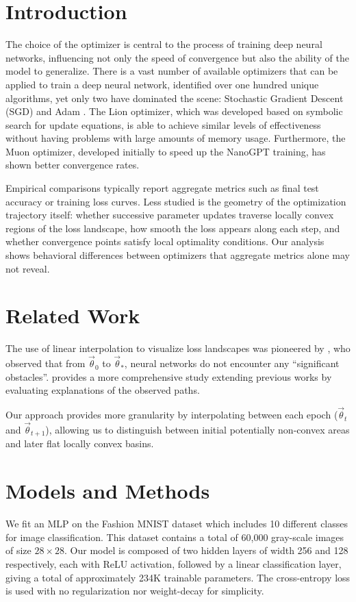 \documentclass[10pt,conference,compsocconf]{IEEEtran}
\begin{document}
\section{Introduction}
The choice of the optimizer is central to the process of training deep neural networks, 
influencing not only the speed of convergence but also the ability of the model to generalize.
There is a vast number of available optimizers that can be applied to train
a deep neural network, \cite{schneider2021descending} identified over one hundred unique algorithms,
yet only two have dominated the scene: Stochastic Gradient Descent (SGD)
\cite{robbins1951stochastic} and Adam \cite{kingma2015adam}.
The Lion optimizer, which was developed based on symbolic search for update equations,
is able to achieve similar levels of effectiveness without having problems with large amounts of
memory usage.
Furthermore, the Muon optimizer, developed initially to speed up the NanoGPT
training, has shown better convergence rates.

Empirical comparisons typically report aggregate metrics such as final test accuracy 
or training loss curves. Less studied is the geometry of the optimization trajectory 
itself: whether successive parameter updates traverse locally convex regions of the 
loss landscape, how smooth the loss appears along each step, and whether convergence 
points satisfy local optimality conditions. Our analysis shows behavioral differences between
optimizers that aggregate metrics alone may not reveal.

\section{Related Work}
The use of linear interpolation to visualize loss landscapes was pioneered by
\cite{goodfellow2015qualitativelycharacterizingneuralnetwork}, who observed that from
$\vec{\theta}_0$ to $\vec{\theta}_*$, neural networks do not encounter any ``significant obstacles''. 
\cite{lucas2021analyzingmonotoniclinearinterpolation} provides a more comprehensive study extending
previous works by evaluating explanations of the observed paths.

Our approach provides more granularity by interpolating between each epoch ($\vec{\theta}_t$ and
$\vec{\theta}_{t+1}$), allowing us to distinguish between initial potentially non-convex areas and
later flat locally convex basins.


\section{Models and Methods}
We fit an MLP on the Fashion MNIST dataset which includes 10 different classes
for image classification. This dataset contains a total of 60,000 gray-scale images of size
$28\times28$. 
Our model is composed of two hidden layers of width 256 and 128 respectively, each with ReLU
activation, followed by a linear classification layer, giving a total of approximately 234K
trainable parameters.
The cross-entropy loss is used with no regularization nor weight-decay for simplicity.
\end{document}
